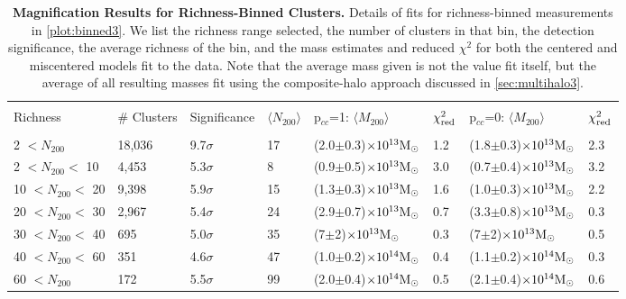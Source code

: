 \begin{landscape}

\begin{table}
  \centering
    \caption[Magnification Results for Richness-Binned Clusters]{{\bf Magnification Results for Richness-Binned Clusters.} Details of fits for richness-binned measurements in \autoref{plot:binned3}. We list the richness range selected, the number of clusters in that bin, the detection significance, the average richness of the bin, and the mass estimates and reduced $\chi^2$ for both the centered and miscentered models fit to the data. Note that the average mass given is not the value fit itself, but the average of all resulting masses fit using the composite-halo approach discussed in \autoref{sec:multihalo3}.}
    \label{richtable3}
    \begin{tabular}{llllllll}
      \hline \\[-10pt]
      Richness & \# Clusters & Significance & $\langle N_{200} \rangle$ & p$_{cc}$=1: $\langle M_{200} \rangle$ & $\chi^2_{\rm red}$ & p$_{cc}$=0: $\langle M_{200} \rangle$ & $\chi^2_{\rm red}$ \\[2pt] \hline \\[-10pt]
      2 $<N_{200}$ & 18,036 & 9.7$\sigma$ & 17 & (2.0$\pm$0.3)$\times10^{13} {\rm M}_{\odot}$ & 1.2 & (1.8$\pm$0.3)$\times10^{13} {\rm M}_{\odot}$ & 2.3  \\
      2 $<N_{200}<$ 10 & 4,453 & 5.3$\sigma$ & 8 & (0.9$\pm$0.5)$\times10^{13} {\rm M}_{\odot}$ & 3.0 & (0.7$\pm$0.4)$\times10^{13} {\rm M}_{\odot}$ & 3.2  \\
      10 $<N_{200}<$ 20 & 9,398 & 5.9$\sigma$ & 15 & (1.3$\pm$0.3)$\times10^{13} {\rm M}_{\odot}$ & 1.6 & (1.0$\pm$0.3)$\times10^{13} {\rm M}_{\odot}$ & 2.2  \\
      20 $<N_{200}<$ 30 & 2,967 & 5.4$\sigma$ & 24 & (2.9$\pm$0.7)$\times10^{13} {\rm M}_{\odot}$ & 0.7 & (3.3$\pm$0.8)$\times10^{13} {\rm M}_{\odot}$ & 0.3  \\
      30 $<N_{200}<$ 40 & 695 & 5.0$\sigma$ & 35 & (7$\pm$2)$\times10^{13} {\rm M}_{\odot}$ & 0.3 & (7$\pm$2)$\times10^{13} {\rm M}_{\odot}$ & 0.5  \\
      40 $<N_{200}<$ 60 & 351 & 4.6$\sigma$ & 47 & (1.0$\pm$0.2)$\times10^{14} {\rm M}_{\odot}$ & 0.4 & (1.1$\pm$0.2)$\times10^{14} {\rm M}_{\odot}$ & 0.3  \\
      60 $<N_{200}$ & 172 & 5.5$\sigma$ & 99 & (2.0$\pm$0.4)$\times10^{14} {\rm M}_{\odot}$ & 0.5 & (2.1$\pm$0.4)$\times10^{14} {\rm M}_{\odot}$ & 0.6  \\[2pt]
      \hline
    \end{tabular}
\end{table}


\end{landscape}
